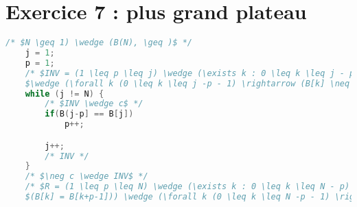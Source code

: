 \section{Exercice 7 : plus grand plateau}
\begin{lstlisting}[language=C]
	/* $N \geq 1) \wedge (B(N), \geq )$ */
	j = 1;
	p = 1;
	/* $INV = (1 \leq p \leq j) \wedge (\exists k : 0 \leq k \leq j - p) \wedge (B[k] = B[k+p-1]))$
	$\wedge (\forall k (0 \leq k \leq j -p - 1) \rightarrow (B[k] \neq B[k+p]))$ */
	while (j != N) {
		/* $INV \wedge c$ */
		if(B(j-p] == B[j]) 
			p++;

		j++;
		/* INV */
	}
	/* $\neg c \wedge INV$ */
	/* $R = (1 \leq p \leq N) \wedge (\exists k : 0 \leq k \leq N - p) \wedge $
	$(B[k] = B[k+p-1])) \wedge (\forall k (0 \leq k \leq N -p - 1) \rightarrow (B[k] \neq B[k+p]))$ */
\end{lstlisting}

